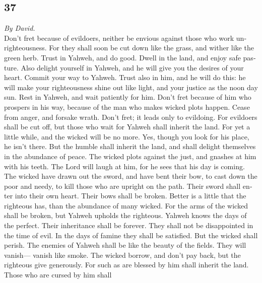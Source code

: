 \begin{paracol}{2}
\begin{otherlanguage}{english}
\hypertarget{section-73}{%
\section{37}\label{section-73}}

\emph{By David.}\\
 Don't fret because of evildoers, neither be envious
against those who work unrighteousness.  For they shall
soon be cut down like the grass, and wither like the green herb.
 Trust in Yahweh, and do good. Dwell in the land, and
enjoy safe pasture.  Also delight yourself in Yahweh, and
he will give you the desires of your heart.  Commit your
way to Yahweh. Trust also in him, and he will do this:  he
will make your righteousness shine out like light, and your justice as
the noon day sun.  Rest in Yahweh, and wait patiently for
him. Don't fret because of him who prospers in his way, because of the
man who makes wicked plots happen.  Cease from anger, and
forsake wrath. Don't fret; it leads only to evildoing. 
For evildoers shall be cut off, but those who wait for Yahweh shall
inherit the land.  For yet a little while, and the wicked
will be no more. Yes, though you look for his place, he isn't there.
 But the humble shall inherit the land, and shall delight
themselves in the abundance of peace.  The wicked plots
against the just, and gnashes at him with his teeth.  The
Lord will laugh at him, for he sees that his day is coming.
 The wicked have drawn out the sword, and have bent their
bow, to cast down the poor and needy, to kill those who are upright on
the path.  Their sword shall enter into their own heart.
Their bows shall be broken.  Better is a little that the
righteous has, than the abundance of many wicked.  For
the arms of the wicked shall be broken, but Yahweh upholds the
righteous.  Yahweh knows the days of the perfect. Their
inheritance shall be forever.  They shall not be
disappointed in the time of evil. In the days of famine they shall be
satisfied.  But the wicked shall perish. The enemies of
Yahweh shall be like the beauty of the fields. They will vanish---
vanish like smoke.  The wicked borrow, and don't pay
back, but the righteous give generously.  For such as are
blessed by him shall inherit the land. Those who are cursed by him shall

\end{otherlanguage}
\end{paracol}

